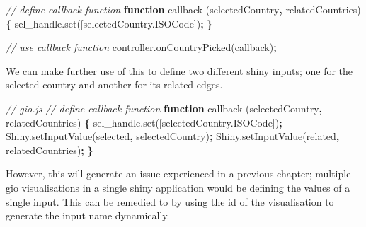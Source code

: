 \documentclass[
]{krantz}
\makeatletter
\newenvironment{Shaded}{\begin{snugshade}}{\end{snugshade}}
\newcommand{\AttributeTok}[1]{\textcolor[rgb]{0.61,0.61,0.61}{#1}}
\newcommand{\CommentTok}[1]{\textcolor[rgb]{0.37,0.37,0.37}{\textit{#1}}}
\newcommand{\KeywordTok}[1]{\textcolor[rgb]{0.27,0.27,0.27}{\textbf{#1}}}
\newcommand{\NormalTok}[1]{#1}
\newcommand{\OperatorTok}[1]{\textcolor[rgb]{0.43,0.43,0.43}{\textbf{#1}}}
\newcommand{\StringTok}[1]{\textcolor[rgb]{0.5,0.5,0.5}{#1}}
\newcommand{\VariableTok}[1]{\textcolor[rgb]{0,0,0}{#1}}
\newenvironment{kframe}{%
\medskip{}
\setlength{\fboxsep}{.8em}
 \def\at@end@of@kframe{}%
 \ifinner\ifhmode%
  \def\at@end@of@kframe{\end{minipage}}%
  \begin{minipage}{\columnwidth}%
 \fi\fi%
 \def\FrameCommand##1{\hskip\@totalleftmargin \hskip-\fboxsep
 \colorbox{shadecolor}{##1}\hskip-\fboxsep
     \hskip-\linewidth \hskip-\@totalleftmargin \hskip\columnwidth}%
 \MakeFramed {\advance\hsize-\width
   \@totalleftmargin\z@ \linewidth\hsize
   \@setminipage}}%
 {\par\unskip\endMakeFramed%
 \at@end@of@kframe}
\renewenvironment{Shaded}{\begin{kframe}}{\end{kframe}}
\makeatother
\begin{document}
\begin{Shaded}
\begin{Highlighting}[]
\CommentTok{// define callback function}
\KeywordTok{function} \AttributeTok{callback}\NormalTok{ (selectedCountry}\OperatorTok{,}\NormalTok{ relatedCountries) }\OperatorTok{\{}
  \VariableTok{sel\_handle}\NormalTok{.}\AttributeTok{set}\NormalTok{([}\VariableTok{selectedCountry}\NormalTok{.}\AttributeTok{ISOCode}\NormalTok{])}\OperatorTok{;}
\OperatorTok{\}}

\CommentTok{// use callback function}
\VariableTok{controller}\NormalTok{.}\AttributeTok{onCountryPicked}\NormalTok{(callback)}\OperatorTok{;}
\end{Highlighting}
\end{Shaded}

We can make further use of this to define two different shiny inputs; one for the selected country and another for its related edges.

\begin{Shaded}
\begin{Highlighting}[]
\CommentTok{// gio.js}
\CommentTok{// define callback function}
\KeywordTok{function} \AttributeTok{callback}\NormalTok{ (selectedCountry}\OperatorTok{,}\NormalTok{ relatedCountries) }\OperatorTok{\{}
  \VariableTok{sel\_handle}\NormalTok{.}\AttributeTok{set}\NormalTok{([}\VariableTok{selectedCountry}\NormalTok{.}\AttributeTok{ISOCode}\NormalTok{])}\OperatorTok{;}
  \VariableTok{Shiny}\NormalTok{.}\AttributeTok{setInputValue}\NormalTok{(}\StringTok{\textquotesingle{}selected\textquotesingle{}}\OperatorTok{,}\NormalTok{ selectedCountry)}\OperatorTok{;}
  \VariableTok{Shiny}\NormalTok{.}\AttributeTok{setInputValue}\NormalTok{(}\StringTok{\textquotesingle{}related\textquotesingle{}}\OperatorTok{,}\NormalTok{ relatedCountries)}\OperatorTok{;}
\OperatorTok{\}}
\end{Highlighting}
\end{Shaded}

However, this will generate an issue experienced in a previous chapter; multiple gio visualisations in a single shiny application would be defining the values of a single input. This can be remedied to by using the id of the visualisation to generate the input name dynamically.
\end{document}
